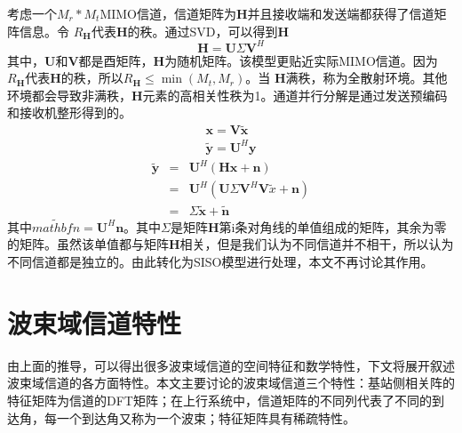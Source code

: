 \documentclass[bachelor,nocolorlinks, printoneside]{seuthesis} %
\begin{document}
\begin{Main}
考虑一个$ M_{r}* M_{t}$MIMO信道，信道矩阵为$\mathbf{H}$并且接收端和发送端都获得了信道矩阵信息。令 $ R_{\mathbf{H}}$代表$\mathbf{H}$的秩。通过SVD，可以得到$\mathbf{H}$
\begin{equation}\label{key}
\mathbf{H}=\mathbf{U}\Sigma\mathbf{V}^{H}
\end{equation}
其中，$\mathbf{U} $和$\mathbf{V} $都是酉矩阵，$\mathbf{H}$为随机矩阵。该模型更贴近实际MIMO信道。因为$ R_{\mathbf{H}}$代表$\mathbf{H}$的秩，所以$ R_{\mathbf{H}} \leq \min(M_{t},M_{r})$。当
$\mathbf{H}$满秩，称为全散射环境。其他环境都会导致非满秩，$\mathbf{H}$元素的高相关性秩为1。通道并行分解是通过发送预编码和接收机整形得到的。
\begin{eqnarray}\label{key}
\mathbf{x}= \mathbf{V}\tilde{\mathbf{x}}  \nonumber\\
\tilde{\mathbf{y}}= \mathbf{U}^{H}\mathbf{y}  \nonumber
\end{eqnarray}
\begin{eqnarray}\label{key}
\tilde{\mathbf{y}} & = &\mathbf{U}^{H}(\mathbf{H}\mathbf{x}+\mathbf{n}) {} \nonumber\\
& = & \mathbf{U}^{H}(\mathbf{U}\Sigma\mathbf{V}^{H}\mathbf{V}\tilde{x}+\mathbf{n}) \nonumber \\
& = & \Sigma\tilde{\mathbf{x}} + \tilde{\mathbf{n}}
\end{eqnarray}
其中$\tilde{mathbf{n}}=\mathbf{U}^{H}\mathbf{n}$。其中$\Sigma$是矩阵$ \mathbf{H}$第i条对角线的单值组成的矩阵，其余为零的矩阵。虽然该单值都与矩阵$ \mathbf{H}$相关，但是我们认为不同信道并不相干，所以认为不同信道都是独立的。由此转化为SISO模型进行处理，本文不再讨论其作用。



\section{波束域信道特性}
由上面的推导，可以得出很多波束域信道的空间特征和数学特性，下文将展开叙述波束域信道的各方面特性。本文主要讨论的波束域信道三个特性：基站侧相关阵的特征矩阵为信道的DFT矩阵；在上行系统中，信道矩阵的不同列代表了不同的到达角，每一个到达角又称为一个波束；特征矩阵具有稀疏特性。


\end{Main}
\end{document}
